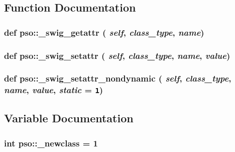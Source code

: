 \subsection{Function Documentation}
\hypertarget{namespacepso_dc78041cebaa55ad5cca2496dc9f1404}{
\subsubsection{\setlength{\rightskip}{0pt plus 5cm}def pso::\_\-swig\_\-getattr ( {\em self}, \/   {\em class\_\-type}, \/   {\em name})}}
\label{namespacepso_dc78041cebaa55ad5cca2496dc9f1404}


\hypertarget{namespacepso_91ad28c204da85fd55f702adc65326dc}{
\subsubsection{\setlength{\rightskip}{0pt plus 5cm}def pso::\_\-swig\_\-setattr ( {\em self}, \/   {\em class\_\-type}, \/   {\em name}, \/   {\em value})}}
\label{namespacepso_91ad28c204da85fd55f702adc65326dc}


\hypertarget{namespacepso_7657775da111513d2fbef74487722796}{
\subsubsection{\setlength{\rightskip}{0pt plus 5cm}def pso::\_\-swig\_\-setattr\_\-nondynamic ( {\em self}, \/   {\em class\_\-type}, \/   {\em name}, \/   {\em value}, \/   {\em static} = {\tt 1})}}
\label{namespacepso_7657775da111513d2fbef74487722796}




\subsection{Variable Documentation}
\hypertarget{namespacepso_ded3b08752a6cab2f7301e0121c8e389}{
\subsubsection{\setlength{\rightskip}{0pt plus 5cm}int {\bf pso::\_\-newclass} = 1}}
\label{namespacepso_ded3b08752a6cab2f7301e0121c8e389}


